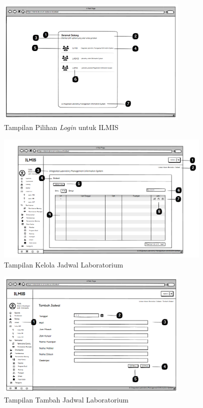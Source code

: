 \begin{figure}
	\centering
	\includegraphics[width=0.82\textwidth]{konten/gambar/pilih-login.png}
	\caption{Tampilan Pilihan \textit{Login} untuk ILMIS}
	\label{fig:pilih-login-interface}
\end{figure}

\begin{figure}
	\centering
	\includegraphics[width=0.92\textwidth]{konten/gambar/user interface/ui-jadwal.png}
	\caption{Tampilan Kelola Jadwal Laboratorium}
	\label{fig:kelola-jadwal}
\end{figure}

\begin{figure}
	\centering
	\includegraphics[width=0.82\textwidth]{konten/gambar/tambah-jadwal.png}
	\caption{Tampilan Tambah Jadwal Laboratorium}
	\label{fig:tambah-jadwal-interface}
\end{figure}


